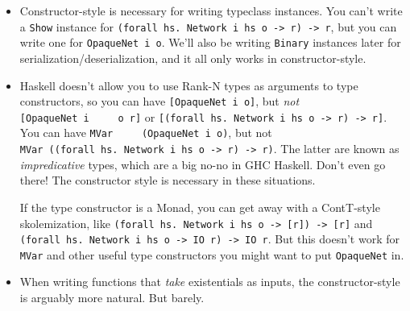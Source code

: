\documentclass[]{article}
\newenvironment{Shaded}{}{}
\newcommand{\CommentTok}[1]{\textcolor[rgb]{0.38,0.63,0.69}{\textit{#1}}}
\newcommand{\DataTypeTok}[1]{\textcolor[rgb]{0.56,0.13,0.00}{#1}}
\newcommand{\FunctionTok}[1]{\textcolor[rgb]{0.02,0.16,0.49}{#1}}
\newcommand{\KeywordTok}[1]{\textcolor[rgb]{0.00,0.44,0.13}{\textbf{#1}}}
\newcommand{\NormalTok}[1]{#1}
\newcommand{\OperatorTok}[1]{\textcolor[rgb]{0.40,0.40,0.40}{#1}}
\newcommand{\OtherTok}[1]{\textcolor[rgb]{0.00,0.44,0.13}{#1}}
\renewcommand{\href}[2]{#2\footnote{\url{#1}}}
\begin{document}
\begin{itemize}
  A lot of libraries return existentials in \texttt{Maybe}'s
  (\href{http://hackage.haskell.org/package/base-4.9.0.0/docs/GHC-TypeLits.html\#v:someNatVal}{base
  is guilty}), so this trick can be useful for those, too!

  This trick is less useful for functions like \texttt{toSing} where things are
  \emph{not} returned in a monad. You could wrap it in Identity, but that's kind
  of silly:

\begin{Shaded}
\end{Shaded}
\item
  Constructor-style is necessary for writing typeclass instances. You can't
  write a \texttt{Show} instance for
  \texttt{(forall\ hs.\ Network\ i\ hs\ o\ -\textgreater{}\ r)\ -\textgreater{}\ r},
  but you can write one for \texttt{OpaqueNet\ i\ o}. We'll also be writing
  \texttt{Binary} instances later for serialization/deserialization, and it all
  only works in constructor-style.
\item
  Haskell doesn't allow you to use Rank-N types as arguments to type
  constructors, so you can have \texttt{{[}OpaqueNet\ i\ o{]}}, but \emph{not}
  \texttt{{[}OpaqueNet\textquotesingle{}\ i\ \ \ \ \ o\ r{]}} or
  \texttt{{[}(forall\ hs.\ Network\ i\ hs\ o\ -\textgreater{}\ r)\ -\textgreater{}\ r{]}}.
  You can have \texttt{MVar\ \ \ \ \ (OpaqueNet\ i\ o)}, but not
  \texttt{MVar\ ((forall\ hs.\ Network\ i\ hs\ o\ -\textgreater{}\ r)\ -\textgreater{}\ r)}.
  The latter are known as \emph{impredicative} types, which are a big no-no in
  GHC Haskell. Don't even go there! The constructor style is necessary in these
  situations.

  If the type constructor is a Monad, you can get away with a ContT-style
  skolemization, like
  \texttt{(forall\ hs.\ Network\ i\ hs\ o\ -\textgreater{}\ {[}r{]})\ -\textgreater{}\ {[}r{]}}
  and
  \texttt{(forall\ hs.\ Network\ i\ hs\ o\ -\textgreater{}\ IO\ r)\ -\textgreater{}\ IO\ r}.
  But this doesn't work for \texttt{MVar} and other useful type constructors you
  might want to put \texttt{OpaqueNet} in.
\item
  When writing functions that \emph{take} existentials as inputs, the
  constructor-style is arguably more natural. But barely.


\end{itemize}
\end{document}
